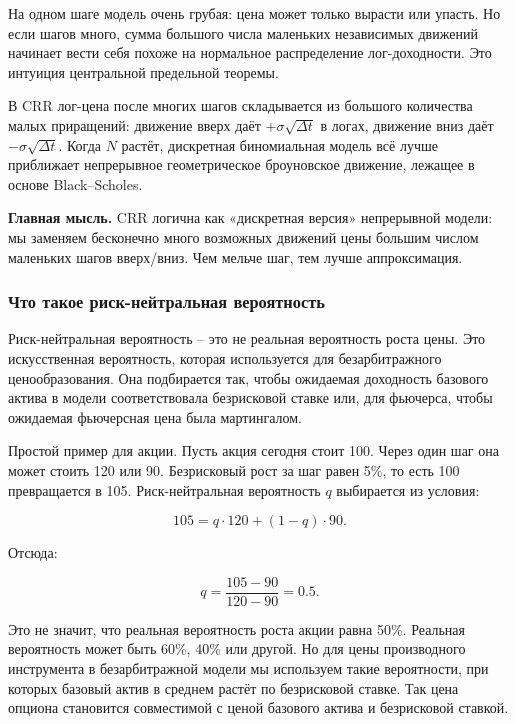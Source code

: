 \documentclass[11pt,a4paper]{article}
\newcommand{\key}[1]{%
  \vspace{0.15em}
  \noindent\colorbox{softblue}{%
    \parbox{\dimexpr\linewidth-2\fboxsep\relax}{\textbf{Главная мысль.} #1}%
  }\vspace{0.2em}
}
\begin{document}
На одном шаге модель очень грубая: цена может только вырасти или упасть. Но если шагов много, сумма большого числа маленьких независимых движений начинает вести себя похоже на нормальное распределение лог-доходности. Это интуиция центральной предельной теоремы.

В CRR лог-цена после многих шагов складывается из большого количества малых приращений: движение вверх даёт $+\sigma\sqrt{\Delta t}$ в логах, движение вниз даёт $-\sigma\sqrt{\Delta t}$. Когда $N$ растёт, дискретная биномиальная модель всё лучше приближает непрерывное геометрическое броуновское движение, лежащее в основе Black--Scholes.

\key{CRR логична как «дискретная версия» непрерывной модели: мы заменяем бесконечно много возможных движений цены большим числом маленьких шагов вверх/вниз. Чем мельче шаг, тем лучше аппроксимация.}

\subsubsection{Что такое риск-нейтральная вероятность}

Риск-нейтральная вероятность -- это не реальная вероятность роста цены. Это искусственная вероятность, которая используется для безарбитражного ценообразования. Она подбирается так, чтобы ожидаемая доходность базового актива в модели соответствовала безрисковой ставке или, для фьючерса, чтобы ожидаемая фьючерсная цена была мартингалом.

Простой пример для акции. Пусть акция сегодня стоит 100. Через один шаг она может стоить 120 или 90. Безрисковый рост за шаг равен 5\%, то есть 100 превращается в 105. Риск-нейтральная вероятность $q$ выбирается из условия:

\begin{equation}
105=q\cdot120+(1-q)\cdot90.
\end{equation}

Отсюда:

\begin{equation}
q=\frac{105-90}{120-90}=0.5.
\end{equation}

Это не значит, что реальная вероятность роста акции равна 50\%. Реальная вероятность может быть 60\%, 40\% или другой. Но для цены производного инструмента в безарбитражной модели мы используем такие вероятности, при которых базовый актив в среднем растёт по безрисковой ставке. Так цена опциона становится совместимой с ценой базового актива и безрисковой ставкой.
\end{document}
